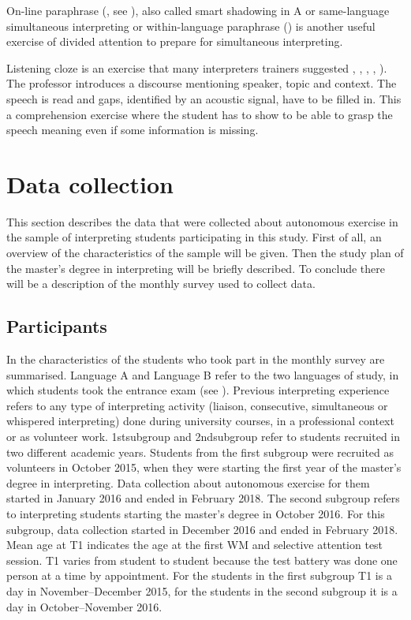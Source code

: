 \documentclass[output=paper]{../langscibook}
\begin{document}
On-line paraphrase (\citealt{RussoPippa2004}, see ), also called smart shadowing in A or same-language simultaneous interpreting or within-language paraphrase (\citealt{SettonDawrant2016a}) is another useful exercise of divided attention to prepare for simultaneous interpreting.

Listening cloze is an exercise that many interpreters trainers suggested \citealt{vanDam1989}, \citealt{Kalina1992},  \citealt{PadillaBenitez2002}, \citealt{AndresBodenFuchs2015}, \citealt{SettonDawrant2016b}). The professor introduces a discourse mentioning speaker, topic and context. The speech is read and gaps, identified by an acoustic signal, have to be filled in. This a comprehension exercise where the student has to show to be able to grasp the speech meaning even if some information is missing.


\section{Data collection}


This section describes the data that were collected about autonomous exercise in the sample of interpreting students participating in this study. First of all, an overview of the characteristics of the sample will be given. Then the study plan of the master’s degree in interpreting will be briefly described. To conclude there will be a description of the monthly survey used to collect data.



\subsection{Participants}

In  the characteristics of the students who took part in the monthly survey are summarised. Language A and Language B refer to the two languages of study, in which students took the entrance exam (see ). Previous interpreting experience refers to any type of interpreting activity (liaison, consecutive, simultaneous or whispered interpreting) done during university courses, in a professional context or as volunteer work. 1stsubgroup and 2ndsubgroup refer to students recruited in two different academic years. Students from the first subgroup were recruited as volunteers in October 2015, when they were starting the first year of the master’s degree in interpreting. Data collection about autonomous exercise for them started in January 2016 and ended in February 2018. The second subgroup refers to interpreting students starting the master’s degree in October 2016. For this subgroup, data collection started in December 2016 and ended in February 2018. Mean age at T1 indicates the age at the first WM and selective attention test session. T1 varies from student to student because the test battery was done one person at a time by appointment. For the students in the first subgroup T1 is a day in November--December 2015, for the students in the second subgroup it is a day in October--November 2016.
\end{document}
